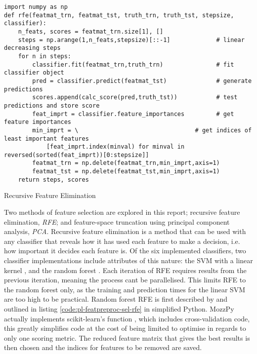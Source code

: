         \begin{listing}[ht]
            \begin{verbatim}
import numpy as np
def rfe(featmat_trn, featmat_tst, truth_trn, truth_tst, stepsize, classifier):
    n_feats, scores = featmat_trn.size[1], []
    steps = np.arange(1,n_feats,stepsize)[::-1]             # linear decreasing steps
    for n in steps:          
        classifier.fit(featmat_trn,truth_trn)               # fit classifier object
        pred = classifier.predict(featmat_tst)              # generate predictions
        scores.append(calc_score(pred,truth_tst))           # test predictions and store score
        feat_imprt = classifier.feature_importances         # get feature importances
        min_imprt = \                                 # get indices of least important features
            [feat_imprt.index(minval) for minval in reversed(sorted(feat_imprt))[0:stepsize]] 
        featmat_trn = np.delete(featmat_trn,min_imprt,axis=1) 
        featmat_tst = np.delete(featmat_tst,min_imprt,axis=1)
    return steps, scores
            \end{verbatim}
            \caption{Recursive Feature Elimination}
            \label{code:pl-featpreproc-sel-rfe}
        \end{listing}
        
        Two methods of feature selection are explored in this report; recursive feature elimination, \textit{RFE}; and feature-space truncation using principal component analysis, \textit{PCA}. Recursive feature elimination is a method that can be used with any classifier that reveals how it has used each feature to make a decision, i.e. how important it decides each feature is. Of the six implemented classifiers, two classifier implementations include attributes of this nature: the SVM with a linear kernel \cite{Guyon2002}, and the random forest \cite{Granitto2006}. Each iteration of RFE requires results from the previous iteration, meaning the process cant be parallelised. This limits RFE to the random forest only, as the training and prediction times for the linear SVM are too high to be practical. Random forest RFE is first described by \textcite{Granitto2006} and outlined in listing \ref{code:pl-featpreproc-sel-rfe} in simplified Python. MozzPy actually implements scikit-learn's function  \cite{Pedregosa2012}, which includes cross-validation code, this greatly simplifies code at the cost of being limited to optimise in regards to only one scoring metric. The reduced feature matrix that gives the best results is then chosen and the indices for features to be removed are saved.
        
